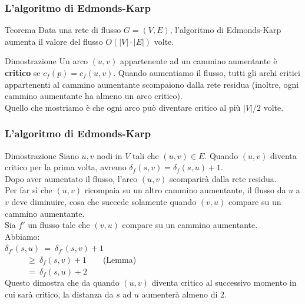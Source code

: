 \documentclass{beamer}
\begin{document}
\begin{frame}
\frametitle{L'algoritmo di Edmonds-Karp}
\begin{block}{Teorema}
Data una rete di flusso $G=(V,E)$, l'algoritmo di Edmonds-Karp aumenta il valore del flusso $O(|V|\cdot|E|)$ volte.
\end{block}
\begin{block}{Dimostrazione}
Un arco $(u,v)$ appartenente ad un cammino aumentante è \textbf{critico} se $c_f(p)=c_f(u,v)$. Quando aumentiamo il flusso, tutti gli archi critici appartenenti al cammino aumentante scompaiono dalla rete residua (inoltre, ogni cammino aumentante ha almeno un arco critico).\\
Quello che mostriamo è che ogni arco può diventare critico al più $|V|/2$ volte.
\end{block}
\end{frame}

\begin{frame}
\frametitle{L'algoritmo di Edmonds-Karp}
\begin{block}{Dimostrazione}
Siano $u,v$ nodi in $V$ tali che $(u,v)\in E$. Quando $(u,v)$ diventa critico per la prima volta, avremo $\delta_f(s,v)=\delta_f(s,u)+1$.\\
Dopo aver aumentato il flusso, l'arco $(u,v)$ scomparirà dalla rete residua.\\
Per far sì che $(u,v)$ ricompaia su un altro cammino aumentante, il flusso da $u$ a $v$ deve diminuire, cosa che succede solamente quando $(v,u)$ compare su un cammino aumentante.\\
Sia $f'$ un flusso tale che $(v,u)$ compare su un cammino aumentante.\\
Abbiamo:\\
$\delta_{f'}(s,u)\ =\ \delta_{f'}(s,v)+1$\\
$\ \ \ \ \ \ \ \ \ \ \ \ \geq\ \delta_{f}(s,v)+1$\ \ \ \ (Lemma)\\
$\ \ \ \ \ \ \ \ \ \ \ \ =\ \delta_{f}(s,u)+2$\\
Questo dimostra che da quando $(u,v)$ diventa critico al successivo momento in cui sarà critico, la distanza da $s$ ad $u$ aumenterà almeno di 2.
\end{block}
\end{frame}
\end{document}
